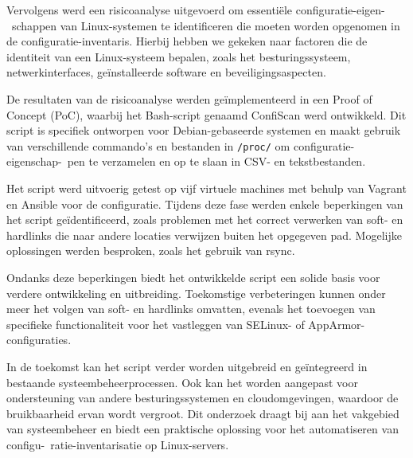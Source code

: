 Vervolgens werd een risicoanalyse uitgevoerd om essenti\"ele configuratie-eigen-\ schappen van Linux-systemen te identificeren die moeten worden opgenomen in de configuratie-inventaris.
Hierbij hebben we gekeken naar factoren die de identiteit van een Linux-systeem bepalen, zoals het besturingssysteem, netwerkinterfaces, ge\"installeerde software en beveiligingsaspecten.

De resultaten van de risicoanalyse werden ge\"implementeerd in een Proof of Concept (PoC), waarbij het Bash-script genaamd ConfiScan werd ontwikkeld.
Dit script is specifiek ontworpen voor Debian-gebaseerde systemen en maakt gebruik van verschillende commando's en bestanden in \texttt{/proc/} om configuratie-eigenschap-\ pen te verzamelen en op te slaan in CSV- en tekstbestanden.

Het script werd uitvoerig getest op vijf virtuele machines met behulp van Vagrant en Ansible voor de configuratie.
Tijdens deze fase werden enkele beperkingen van het script ge\"identificeerd, zoals problemen met het correct verwerken van soft- en hardlinks die naar andere locaties verwijzen buiten het opgegeven pad.
Mogelijke oplossingen werden besproken, zoals het gebruik van rsync.

Ondanks deze beperkingen biedt het ontwikkelde script een solide basis voor verdere ontwikkeling en uitbreiding.
Toekomstige verbeteringen kunnen onder meer het volgen van soft- en hardlinks omvatten, evenals het toevoegen van specifieke functionaliteit voor het vastleggen van SELinux- of AppArmor-configuraties.

In de toekomst kan het script verder worden uitgebreid en ge\"integreerd in bestaande systeembeheerprocessen.
Ook kan het worden aangepast voor ondersteuning van andere besturingssystemen en cloudomgevingen, waardoor de bruikbaarheid ervan wordt vergroot.
Dit onderzoek draagt bij aan het vakgebied van systeembeheer en biedt een praktische oplossing voor het automatiseren van configu-\ ratie-inventarisatie op Linux-servers.
